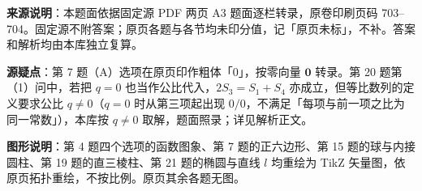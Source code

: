 


\begin{gktip}
\textbf{来源说明}：本题面依据固定源 PDF 两页 A3 题面逐栏转录，原卷印刷页码 703–704。固定源不附答案；原页各题与各节均未印分值，记「原页未标」，不补。答案和解析均由本库独立复算。

\textbf{源疑点}：第 7 题（A）选项在原页印作粗体「0」，按零向量 $\boldsymbol 0$ 转录。第 20 题第（1）问中，若把 $q=0$ 也当作公比代入，$2S_3=S_1+S_4$ 亦成立，但等比数列的定义要求公比 $q\neq0$（$q=0$ 时从第三项起出现 $0/0$，不满足「每项与前一项之比为同一常数」），本库按 $q\neq0$ 取解，题面照录；详见解析正文。

\textbf{图形说明}：第 4 题四个选项的函数图象、第 7 题的正六边形、第 15 题的球与内接圆柱、第 19 题的直三棱柱、第 21 题的椭圆与直线 $l$ 均重绘为 TikZ 矢量图，依原页拓扑重绘，不按比例。原页其余各题无图。
\end{gktip}


